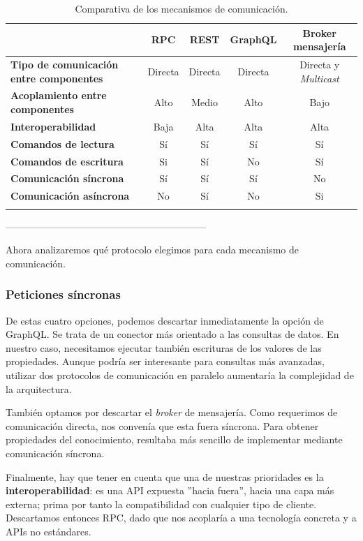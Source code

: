 \begin{longtable}{|p{4.4cm} | c | c | c | c|}
  \hline
  & \textbf{RPC} & \textbf{REST} & \textbf{GraphQL} & \textbf{Broker mensajería} \\
  \hline
  \textbf{Tipo de comunicación entre componentes} & Directa & Directa & Directa & Directa y \emph{Multicast} \\
  \hline
  \textbf{Acoplamiento entre componentes} & Alto & Medio & Alto & Bajo \\
  \hline
  \textbf{Interoperabilidad} & Baja & Alta & Alta & Alta\footnotemark \\
  \hline
  \textbf{Comandos de lectura} & Sí & Sí & Sí & Sí \\
  \hline
  \textbf{Comandos de escritura} & Si & Sí & No & Sí \\
  \hline
  \textbf{Comunicación síncrona} & Sí & Sí & Sí & No \\
  \hline
  \textbf{Comunicación asíncrona} & No & Sí & No & Si \\
  \hline
  \caption{Comparativa de los mecanismos de comunicación.}
  \label{tab:comparativa-mecanismos-comunicacion}
\end{longtable}



--------------------------------------------------------------

Ahora analizaremos qué protocolo elegimos para cada mecanismo de comunicación.

\subsubsection{Peticiones síncronas}

De estas cuatro opciones, podemos descartar inmediatamente la opción de GraphQL. Se trata de un conector más orientado a las consultas de datos. En nuestro caso, necesitamos ejecutar también escrituras de los valores de las propiedades. Aunque podría ser interesante para consultas más avanzadas, utilizar dos protocolos de comunicación en paralelo aumentaría la complejidad de la arquitectura.

También optamos por descartar el \emph{broker} de mensajería. Como requerimos de comunicación directa, nos convenía que esta fuera síncrona. Para obtener propiedades del conocimiento, resultaba más sencillo de implementar mediante comunicación síncrona.

Finalmente, hay que tener en cuenta que una de nuestras prioridades es la \textbf{interoperabilidad}: es una API expuesta ''hacia fuera'', hacia una capa más externa; prima por tanto la compatibilidad con cualquier tipo de cliente. Descartamos entonces RPC, dado que nos acoplaría a una tecnología concreta y a APIs no estándares.

